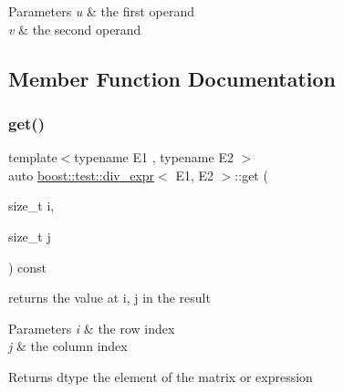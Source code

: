 \begin{DoxyParams}{Parameters}
{\em u} & the first operand \\
\hline
{\em v} & the second operand \\
\hline
\end{DoxyParams}


\subsection{Member Function Documentation}
\mbox{\label{classboost_1_1test_1_1div__expr_a45c4a21d173f7b26d55a9137b910427d}} 
\subsubsection{\texorpdfstring{get()}{get()}}
{\footnotesize\ttfamily template$<$typename E1 , typename E2 $>$ \\
auto \mbox{\hyperlink{classboost_1_1test_1_1div__expr}{boost\+::test\+::div\+\_\+expr}}$<$ E1, E2 $>$\+::get (\begin{DoxyParamCaption}\item[{size\+\_\+t}]{i,  }\item[{size\+\_\+t}]{j }\end{DoxyParamCaption}) const\hspace{0.3cm}{\ttfamily [inline]}}



returns the value at i, j in the result 


\begin{DoxyParams}{Parameters}
{\em i} & the row index \\
\hline
{\em j} & the column index \\
\hline
\end{DoxyParams}
\begin{DoxyReturn}{Returns}
dtype the element of the matrix or expression 
\end{DoxyReturn}
\mbox{\label{classboost_1_1test_1_1div__expr_a9d10c661cdba380c560e5bcf3b8f4446}} 
